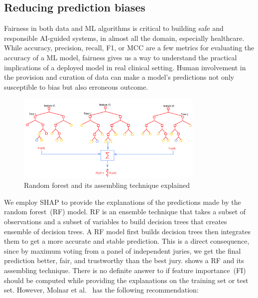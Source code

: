 \subsection{Reducing prediction biases}
Fairness in both data and ML algorithms is critical to building safe and responsible AI-guided systems, in almost all the domain, especially healthcare. While accuracy, precision, recall, F1, or MCC are a few metrics for evaluating the accuracy of a ML model, fairness gives us a way to understand the practical implications of a deployed model in real clinical setting. Human involvement in the provision and curation of data can make a model's predictions not only susceptible to bias but also erroneous outcome. 

\begin{figure}[h]
\centering
	\includegraphics[width=0.8\textwidth]{images/rf_tree.png}
	\caption[Random forest and its assembling technique explained]{Random forest and its assembling technique explained~\cite{karim2018scala}} 
	\label{fig:RF_model}
\end{figure}

\hspace*{3.5mm}We employ SHAP to provide the explanations of the predictions made by the random forest~(RF) model. RF is an ensemble technique that takes a subset of observations and a subset of variables to build decision trees that creates ensemble of decision trees. A RF model first builds decision trees then integrates them to get a more accurate and stable prediction. This is a direct consequence, since by maximum voting from a panel of independent juries, we get the final prediction better, fair, and trustworthy than the best jury.  shows a RF and its assembling technique. There is no definite answer to if feature importance~(FI) should be computed while providing the explanations on the training set or test set. However, Molnar et al.~\cite{molnar2019interpretable} has the following recommendation: 

